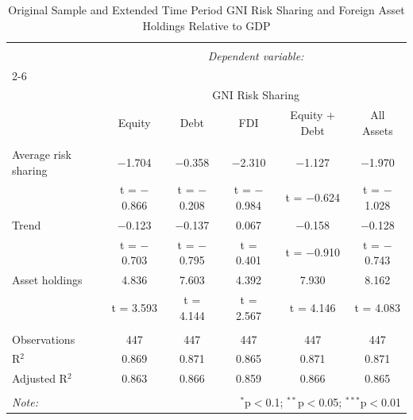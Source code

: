 
\begin{table}[!htbp] \centering 
  \caption{Original Sample and Extended Time Period GNI Risk Sharing and Foreign Asset Holdings Relative to GDP} 
  \label{} 
\begin{tabular}{@{\extracolsep{5pt}}lccccc} 
\\[-1.8ex]\hline 
\hline \\[-1.8ex] 
 & \multicolumn{5}{c}{\textit{Dependent variable:}} \\ 
\cline{2-6} 
\\[-1.8ex] & \multicolumn{5}{c}{GNI Risk Sharing} \\ 
 & Equity & Debt & FDI & Equity + Debt & All Assets \\ 
\hline \\[-1.8ex] 
 Average risk sharing & $-$1.704 & $-$0.358 & $-$2.310 & $-$1.127 & $-$1.970 \\ 
  & t = $-$0.866 & t = $-$0.208 & t = $-$0.984 & t = $-$0.624 & t = $-$1.028 \\ 
  Trend & $-$0.123 & $-$0.137 & 0.067 & $-$0.158 & $-$0.128 \\ 
  & t = $-$0.703 & t = $-$0.795 & t = 0.401 & t = $-$0.910 & t = $-$0.743 \\ 
  Asset holdings & 4.836 & 7.603 & 4.392 & 7.930 & 8.162 \\ 
  & t = 3.593 & t = 4.144 & t = 2.567 & t = 4.146 & t = 4.083 \\ 
 \hline \\[-1.8ex] 
Observations & 447 & 447 & 447 & 447 & 447 \\ 
R$^{2}$ & 0.869 & 0.871 & 0.865 & 0.871 & 0.871 \\ 
Adjusted R$^{2}$ & 0.863 & 0.866 & 0.859 & 0.866 & 0.865 \\ 
\hline 
\hline \\[-1.8ex] 
\textit{Note:}  & \multicolumn{5}{r}{$^{*}$p$<$0.1; $^{**}$p$<$0.05; $^{***}$p$<$0.01} \\ 
\end{tabular} 
\end{table} 
